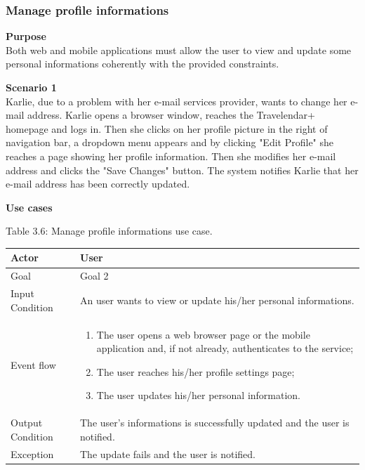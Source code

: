 \documentclass{article}
\begin{document}
	\subsubsection{Manage profile informations}
	
	\bigskip
	\noindent
	\textbf{Purpose} \\
	Both web and mobile applications must allow the user to view and update some personal informations coherently with the provided constraints.
	
	\bigskip
	\noindent
	\textbf{Scenario 1} \\
	Karlie, due to a problem with her e-mail services provider, wants to change her e-mail address. Karlie opens a browser window, reaches the Travelendar+ homepage and logs in. Then she clicks on her profile picture in the right of navigation bar, a dropdown menu appears and by clicking "Edit Profile" she reaches a page showing her profile information. Then she modifies her e-mail address and clicks the "Save Changes" button. The system notifies Karlie that her e-mail address has been correctly updated.
	
	\bigskip
	\noindent
	\textbf{Use cases} \\
	
	\begin{center}
		Table 3.6: Manage profile informations use case.
		
		\bigskip
   		\begin{tabular}{p{}|p{}}
   		 	\hline
    			Actor & User \\ \hline
    			Goal & Goal 2 \\ \hline
    			Input Condition & An user wants to view or update his/her personal informations. \\ \hline
    			Event flow & 
			\begin{enumerate}
  				\item The user opens a web browser page or the mobile application and, if not already, authenticates to the service;
  				\item The user reaches his/her profile settings page;
  				\item The user updates his/her personal information.
 			 \end{enumerate} \\ \hline
    			Output Condition & The user's informations is successfully updated and the user is notified. \\ \hline
    			Exception & The update fails and the user is notified.\\
    			\hline
    		\end{tabular}
	\end{center}
	
\end{document}
